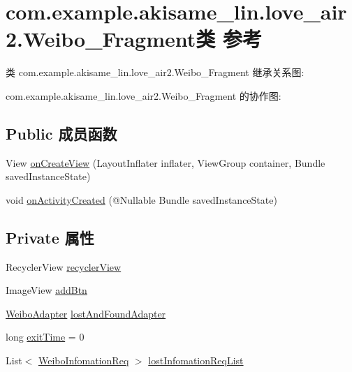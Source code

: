 \hypertarget{classcom_1_1example_1_1akisame__lin_1_1love__air2_1_1_weibo___fragment}{}\section{com.\+example.\+akisame\+\_\+lin.\+love\+\_\+air2.\+Weibo\+\_\+\+Fragment类 参考}
\label{classcom_1_1example_1_1akisame__lin_1_1love__air2_1_1_weibo___fragment}


类 com.\+example.\+akisame\+\_\+lin.\+love\+\_\+air2.\+Weibo\+\_\+\+Fragment 继承关系图\+:


com.\+example.\+akisame\+\_\+lin.\+love\+\_\+air2.\+Weibo\+\_\+\+Fragment 的协作图\+:
\subsection*{Public 成员函数}
\begin{DoxyCompactItemize}
\item 
View \mbox{\hyperlink{classcom_1_1example_1_1akisame__lin_1_1love__air2_1_1_weibo___fragment_a983ba4ccadc9bfb88c6a687ccb945bb1}{on\+Create\+View}} (Layout\+Inflater inflater, View\+Group container, Bundle saved\+Instance\+State)
\item 
void \mbox{\hyperlink{classcom_1_1example_1_1akisame__lin_1_1love__air2_1_1_weibo___fragment_aebeb8cae0d62491e6c1a5e0f452fd0ee}{on\+Activity\+Created}} (@Nullable Bundle saved\+Instance\+State)
\end{DoxyCompactItemize}
\subsection*{Private 属性}
\begin{DoxyCompactItemize}
\item 
Recycler\+View \mbox{\hyperlink{classcom_1_1example_1_1akisame__lin_1_1love__air2_1_1_weibo___fragment_a9ec4cbc37e7bdd495444e151f8e43c79}{recycler\+View}}
\item 
Image\+View \mbox{\hyperlink{classcom_1_1example_1_1akisame__lin_1_1love__air2_1_1_weibo___fragment_a5b2de5475c89d1e4a88b052ea80aa998}{add\+Btn}}
\item 
\mbox{\hyperlink{classcom_1_1example_1_1akisame__lin_1_1love__air2_1_1adapter_1_1_weibo_adapter}{Weibo\+Adapter}} \mbox{\hyperlink{classcom_1_1example_1_1akisame__lin_1_1love__air2_1_1_weibo___fragment_a26db80608c1be73dc8f454bec9237d0e}{lost\+And\+Found\+Adapter}}
\item 
long \mbox{\hyperlink{classcom_1_1example_1_1akisame__lin_1_1love__air2_1_1_weibo___fragment_a0869bb837da6348dabb89d4f572db7d3}{exit\+Time}} = 0
\item 
List$<$ \mbox{\hyperlink{classcom_1_1example_1_1akisame__lin_1_1love__air2_1_1bean1_1_1_weibo_infomation_req}{Weibo\+Infomation\+Req}} $>$ \mbox{\hyperlink{classcom_1_1example_1_1akisame__lin_1_1love__air2_1_1_weibo___fragment_a07c67a47034a1790486f077755e5a65a}{lost\+Infomation\+Req\+List}}
\end{DoxyCompactItemize}
